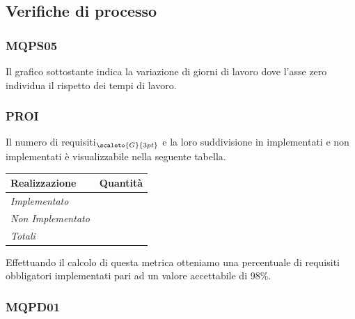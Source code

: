 {{{{\subsection{Verifiche di processo}\label{ResocontoAttivitàDiVerificaRevisioneDiQualificaVerificheDiProcesso}

\subsubsection{MQPS05}\label{ResocontoAttivitàDiVerificaRevisioneDiQualificaVerificheDiProcessoMPQS05}

Il grafico sottostante indica la variazione di giorni di lavoro dove l'asse zero individua il rispetto dei tempi di lavoro.

\subsubsection{PROI}\label{ResocontoAttivitàDiVerificaRevisioneDiQualificaVerificheDiProcessoPROI}

Il numero di requisiti$_{\scaleto{G}{3pt}}$ e la loro suddivisione in implementati e non implementati è visualizzabile nella seguente tabella.

\quad
\def\tabularxcolumn#1{m{#1}}
{
	\begin{center}
		\renewcommand{\arraystretch}{1.4}
		\begin{longtable}[c]{|p{4cm}|p{3cm}|}
			\hline
			\rowcolor{airforceblue}
			\textbf{Realizzazione} & \textbf{Quantità}\\
			\hline
			\textit{Implementato} & \makecell[c]{45}\\
			\hline
			\textit{Non Implementato} & \makecell[c]{1} \\
			\hline
			\textit{Totali} & \makecell[c]{46} \\
		\end{longtable}
	\end{center}

Effettuando il calcolo di questa metrica otteniamo una percentuale di requisiti obbligatori implementati pari ad un valore accettabile di 98\%.

\subsubsection{MQPD01}\label{ResocontoAttivitàDiVerificaRevisioneDiQualificaVerificheDiProcessoMQPD01}

}}}}}
